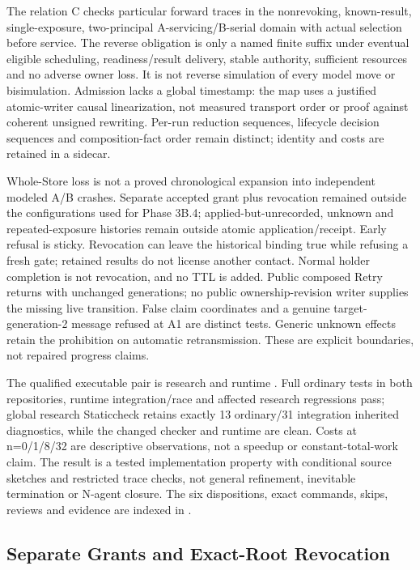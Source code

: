 \documentclass[11pt,a4paper]{article}
\theoremstyle{definition}
\theoremstyle{remark}
\begin{document}
The relation C checks particular forward traces in the nonrevoking, known-result, single-exposure, two-principal A-servicing/B-serial domain with actual selection before service. The reverse obligation is only a named finite suffix under eventual eligible scheduling, readiness/result delivery, stable authority, sufficient resources and no adverse owner loss. It is not reverse simulation of every model move or bisimulation. Admission lacks a global timestamp: the map uses a justified atomic-writer causal linearization, not measured transport order or proof against coherent unsigned rewriting. Per-run reduction sequences, lifecycle decision sequences and composition-fact order remain distinct; identity and costs are retained in a sidecar.

Whole-Store loss is not a proved chronological expansion into independent modeled A/B crashes. Separate accepted grant plus revocation remained outside the configurations used for Phase 3B.4; applied-but-unrecorded, unknown and repeated-exposure histories remain outside atomic application/receipt. Early refusal is sticky. Revocation can leave the historical binding true while refusing a fresh gate; retained results do not license another contact. Normal holder completion is not revocation, and no TTL is added. Public composed Retry returns  with unchanged generations; no public ownership-revision writer supplies the missing live transition. False claim coordinates and a genuine target-generation-2 message refused at A1 are distinct tests. Generic unknown effects retain the prohibition on automatic retransmission. These are explicit boundaries, not repaired progress claims.

The qualified executable pair is research  and runtime . Full ordinary tests in both repositories, runtime integration/race and affected research regressions pass; global research Staticcheck retains exactly 13 ordinary/31 integration inherited diagnostics, while the changed checker and runtime are clean. Costs at n=0/1/8/32 are descriptive observations, not a speedup or constant-total-work claim. The result is a tested implementation property with conditional source sketches and restricted trace checks, not general refinement, inevitable termination or N-agent closure. The six dispositions, exact commands, skips, reviews and evidence are indexed in .

\subsection{Separate Grants and Exact-Root Revocation}
\end{document}
